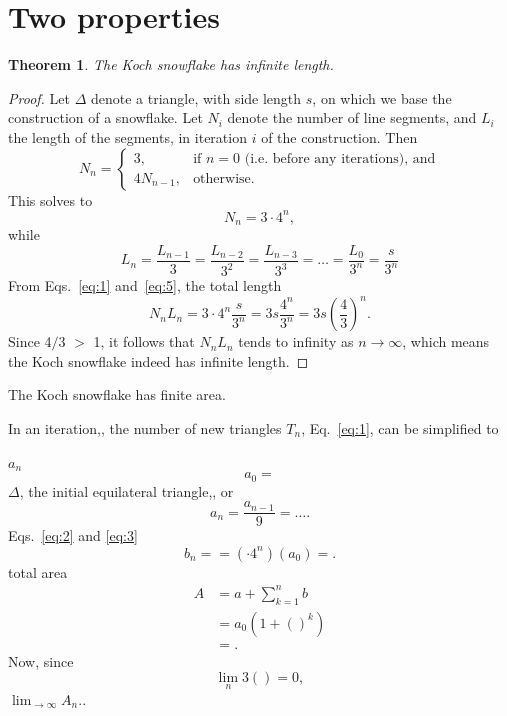\documentclass[12pt,a4paper]{article}
\newtheorem{theorem}{Theorem}
\begin{document}
\section{Two properties}
\begin{theorem}
  The Koch snowflake has infinite length. 
\end{theorem}
\begin{proof}
  Let
  $\Delta$
  denote a triangle, with side length $s$, on which we base the construction of a snowflake.
  Let
  $N_i$ 
  denote the number of line segments, 
  and
  $L_i$ 
  the length of the segments, in iteration $i$ of the construction.
  Then
  \begin{displaymath}
    N_n =
    \begin{cases}
      3, & \text{if $n=0$ (i.e. before any iterations), and} \\4N_{n-1}, & \text{otherwise.}
    \end{cases}
  \end{displaymath}
  This solves to
  \begin{equation}
    \label{eq:1}
    N_n = 3 \cdot 4^n,
  \end{equation}
   while  
  \begin{equation}
    \label{eq:5}
    L_n = \frac{L_{n-1}}{3} = \frac{L_{n-2}}{3^2} = \frac{L_{n-3}}{3^3} = \ldots = \frac{L_0}{3^n} = \frac{s}{3^n}
  \end{equation}
  From Eqs.~\ref{eq:1}  and~\ref{eq:5}, the total length
  \begin{displaymath}
    N_nL_n = 3 \cdot 4^n\frac{s}{3^n} = 3s\frac{4^n}{3^n} = 3s\left(\frac{4}{3}\right)^n.
  \end{displaymath}
  Since 4$/$3 $>$ 1, it follows that $N_nL_n$ tends to infinity as $n \to \infty$, which means the Koch snowflake indeed has infinite length.
\end{proof}

  The Koch snowflake has finite area. 

  
  In an iteration,, the number of new triangles $T_n$,
    Eq.~\ref{eq:1}, can be simplified to 

    \label{eq:2}

    
  $a_n$
  \begin{displaymath}
    a_0=
  \end{displaymath}
  $\Delta$, the initial equilateral triangle,, or 
  \begin{equation}
    \label{eq:3}
    a_n = \frac{a_{n-1}}{9} = \ldots .
  \end{equation}
  Eqs.~\ref{eq:2} and \ref{eq:3}
  \begin{equation*}
    b_n = = \left( \cdot 4^n \right) \left( a_0 \right)  =. 
  \end{equation*}
  total area
  \begin{align*}
    A &= a + \sum_{k=1}^n b \\
      &= a_0\left(1 + \left( \right)^k \right) \\
      &= .
   \end{align*}
  Now, since
  \begin{displaymath}
    \lim_{n} 3\left( \right) = 0,
  \end{displaymath}
  $\lim_{\to \infty} A_n$..  
\end{document}
